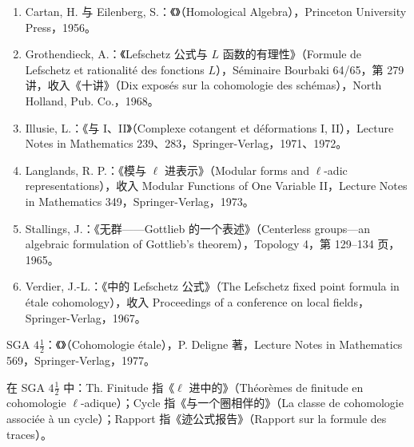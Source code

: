 \begin{enumerate}
\item[{[1]}] Cartan, H. 与 Eilenberg, S.：《》（Homological Algebra），Princeton University Press，1956。
\item[{[2]}] Grothendieck, A.：《Lefschetz 公式与 $L$ 函数的有理性》（Formule de Lefschetz et rationalité des fonctions $L$），Séminaire Bourbaki 64/65，第 279 讲，收入《十讲》（Dix exposés sur la cohomologie des schémas），North Holland, Pub. Co.，1968。
\item[{[3]}] Illusie, L.：《与 I、II》（Complexe cotangent et déformations I, II），Lecture Notes in Mathematics 239、283，Springer-Verlag，1971、1972。
\item[{[4]}] Langlands, R. P.：《模与 $\ell$ 进表示》（Modular forms and $\ell$-adic representations），收入 Modular Functions of One Variable II，Lecture Notes in Mathematics 349，Springer-Verlag，1973。
\item[{[5]}] Stallings, J.：《无群——Gottlieb 的一个表述》（Centerless groups---an algebraic formulation of Gottlieb's theorem），Topology 4，第 129--134 页，1965。
\item[{[6]}] Verdier, J.-L.：《中的 Lefschetz 公式》（The Lefschetz fixed point formula in étale cohomology），收入 Proceedings of a conference on local fields，Springer-Verlag，1967。
\end{enumerate}
SGA $4\frac12$：《》（Cohomologie étale），P. Deligne 著，Lecture Notes in Mathematics 569，Springer-Verlag，1977。

在 SGA $4\frac12$ 中：Th. Finitude 指《$\ell$ 进中的》（Théorèmes de finitude en cohomologie $\ell$-adique）；Cycle 指《与一个圈相伴的》（La classe de cohomologie associée à un cycle）；Rapport 指《迹公式报告》（Rapport sur la formule des traces）。
